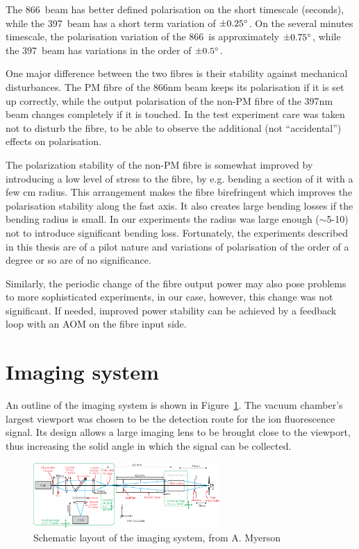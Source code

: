 The 866\nm\, beam has better defined polarisation on the short timescale (seconds), while the 397\nm\, beam has a short term variation of $\pm 0.25\mbox{$^{\circ}$}$. On the several minutes timescale, the polarisation variation of the 866\nm\, is approximately $\pm 0.75\mbox{$^{\circ}$}$, while the 397\nm\, beam has variations in the order of $\pm 0.5\mbox{$^{\circ}$}$. 

One major difference between the two fibres is their stability against mechanical disturbances. The PM fibre of the 866nm beam keeps its polarisation if it is set up correctly, while the output polarisation of the non-PM fibre of the 397nm beam changes completely if it is touched. In the test experiment care was taken not to disturb the fibre, to be able to observe the additional (not ``accidental'') effects on polarisation.

The polarization stability of the non-PM fibre is somewhat improved by introducing a low level of stress to the fibre, by e.g. bending a section of it with a few cm radius. This arrangement makes the fibre birefringent which improves the polarisation stability along the fast axis. It also creates large bending losses if the bending radius is small. In our experiments the radius was large enough ($\sim$5-10\cm) not to introduce significant bending loss. Fortunately, the experiments described in this thesis are of a pilot nature and variations of polarisation of the order of a degree or so are of no significance.


Similarly, the periodic change of the fibre output power may also pose problems to more sophisticated experiments, in our case, however, this change was not significant. If needed, improved power stability can be achieved by a feedback loop with an AOM on the fibre input side. 



\section{Imaging system}

An outline of the imaging system is shown in Figure~\ref{fig:imagingsystem}. The vacuum chamber's largest viewport was chosen to be the detection route for the ion fluorescence signal. Its design allows a large imaging lens to be brought close to the viewport, thus increasing the solid angle in which the signal can be collected. 

\begin{figure}[h!t]
\centering
\includegraphics[angle=90,width=7.1cm]{chapter4/imaging/systplan}
\caption[Imaging system]{Schematic layout of the imaging system, from A. Myerson \cite{Myerson2007}}
\label{fig:imagingsystem}
\end{figure} 


